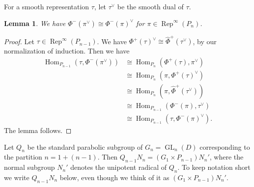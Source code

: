 \documentclass[a4paper]{amsart}
\numberwithin{equation}{section}
\newtheorem{lem}[thm]{Lemma}
\theoremstyle{remark}
\theoremstyle{definition}
\DeclareMathOperator{\Hom}{Hom}
\DeclareMathOperator{\Rep}{Rep}
\DeclareMathOperator{\GL}{GL}
\renewcommand{\simeq}{\cong}
\begin{document}
For a smooth representation $\tau$, let $\tau^{\vee}$ be the smooth dual of $\tau$.

\begin{lem}\label{lem:dual and Phi^-}
We have $\Phi^{-}(\pi^{\vee})\simeq \Phi^{-}(\pi)^{\vee}$ for $\pi\in\Rep^{\infty}(P_{n})$.
\end{lem}
\begin{proof}
Let $\tau\in\Rep^{\infty}(P_{n - 1})$.
We have $\Phi^{+}(\tau)^{\vee}\simeq \widehat{\Phi}^{+}(\tau^{\vee})$, by our normalization of induction.
Then we have
\begin{align*}
\Hom_{P_{n - 1}}(\tau,\Phi^{-}(\pi^{\vee}))& \simeq \Hom_{P_{n}}(\Phi^{+}(\tau),\pi^{\vee})\\
& \simeq \Hom_{P_{n}}(\pi,\Phi^{+}(\tau)^{\vee})\\
& \simeq \Hom_{P_{n}}(\pi,\widehat{\Phi}^{+}(\tau^{\vee}))\\
& \simeq \Hom_{P_{n - 1}}(\Phi^{-}(\pi),\tau^{\vee})\\
& \simeq \Hom_{P_{n - 1}}(\tau,\Phi^{-}(\pi)^{\vee}).
\end{align*}
The lemma follows.
\end{proof}

Let $Q_{n}$ be the standard parabolic subgroup of $G_{n} = \GL_{n}(D)$ corresponding to the partition $n = 1 + (n - 1)$.
Then $Q_{n-1}N_n = (G_1 \times P_{n-1})N_n'$, where the normal subgroup $N_n'$ denotes the unipotent radical of $Q_n$.
To keep notation short we write $Q_{n-1}N_n$ below, even though we think of it as $(G_1 \times P_{n-1})N_n'$.
\end{document}

